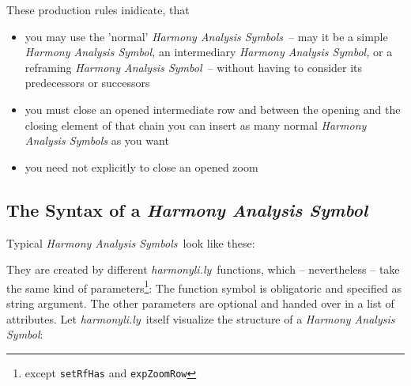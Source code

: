 \documentclass[
  DIV=calc,
  BCOR=5mm,
  12pt,
  headings=small,
  oneside,
  abstract=true,
  toc=bib,
  xcolor=dvipsnames,
  openany,
  ngerman,english]{scrartcl}
\newcommand{\hlyn}[0]{\textit{harmonyli.ly}}
\newcommand{\has}[1]{\textit{Harmony Analysis Symbol#1}}
\begin{document}
These production rules inidicate, that 
\begin{itemize}
  \item you may use the 'normal' \has{s}\ -- may it be a simple \has, an
  intermediary \has, or a reframing \has\ -- without having to consider its
  predecessors or successors
  \item you must close an opened intermediate row and between the opening and
  the closing element of that chain you can insert as many normal \has{s} as you
  want
  \item you need not explicitly to close an opened zoom
\end{itemize}


\subsection{The Syntax of a \has{}}

Typical \has{s}\ look like these:

\begin{center}
\end{center}

They are created by different \hlyn\ functions, which -- nevertheless -- take
the same kind of parameters\footnote{except \texttt{setRfHas} and
\texttt{expZoomRow}}: The function symbol is obligatoric and specified as string
argument. The other parameters are optional and handed over in a list of
attributes. Let \hlyn\ itself visualize the structure of a \has{}:
\end{document}
